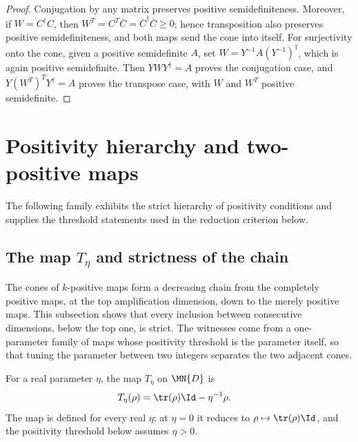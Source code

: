 \begin{proof}\leanok
    Conjugation by any matrix preserves positive semidefiniteness. Moreover,
    if $W=C^\dagger C$, then
    $W^T=C^T\overline C=\overline C^\dagger\overline C\geq0$;
    hence transposition also preserves positive semidefiniteness, and both maps
    send the cone into itself. For surjectivity onto the cone, given
    a positive semidefinite $A$, set
    $W=Y^{-1}A(Y^{-1})^\dagger$, which is again positive semidefinite. Then
    $YWY^\dagger=A$ proves the conjugation case, and
    $Y(W^T)^TY^\dagger=A$ proves the transpose case, with $W$ and $W^T$
    positive semidefinite.
\end{proof}

\section{Positivity hierarchy and two-positive maps}

The following family exhibits the strict hierarchy of positivity conditions
and supplies the threshold statements used in the reduction criterion below.

\subsection{The map \texorpdfstring{$T_\eta$}{T eta} and strictness of the chain}

The cones of $k$-positive maps form a decreasing chain from the completely
positive maps, at the top amplification dimension, down to the merely positive
maps. This subsection shows that every inclusion between consecutive
dimensions, below the top one, is strict. The witnesses come from a
one-parameter family of maps whose positivity threshold is the parameter
itself, so that tuning the parameter between two integers separates the two
adjacent cones.

\begin{definition}
    \label{def:t_eta}
    \leanok
    For a real parameter $\eta$, the map $T_\eta$ on $\MN{D}$ is
    \begin{align}
        T_\eta(\rho) & =\tr(\rho) \Id-\eta^{-1}\rho.
        \notag
    \end{align}
    The map is defined for every real $\eta$; at $\eta=0$ it reduces to
    $\rho\mapsto\tr(\rho) \Id$, and the positivity threshold below
    assumes $\eta>0$.
\end{definition}

